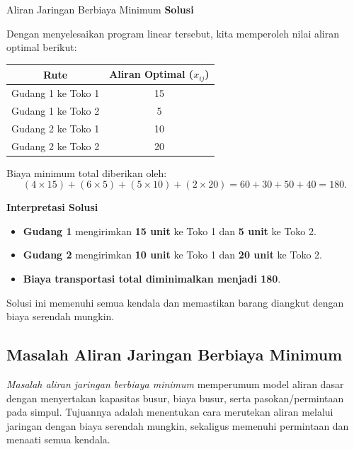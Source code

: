 \begin{examplewithallcode}{Aliran Jaringan Berbiaya Minimum}
\textbf{Solusi}

Dengan menyelesaikan program linear tersebut, kita memperoleh nilai aliran optimal berikut:

    \begin{tabular}{|c|c|}
        \hline
        Rute & Aliran Optimal ($x_{ij}$) \\
        \hline
        Gudang 1 ke Toko 1 & 15 \\
        Gudang 1 ke Toko 2 & 5 \\
        Gudang 2 ke Toko 1 & 10 \\
        Gudang 2 ke Toko 2 & 20 \\
        \hline
    \end{tabular}
\par{}\label{tab:modeling-sums-continued-tab02}%


Biaya minimum total diberikan oleh:
\[
(4 \times 15) + (6 \times 5) + (5 \times 10) + (2 \times 20) = 60 + 30 + 50 + 40 = 180.
\]

\textbf{Interpretasi Solusi}

\begin{itemize}
    \item \textbf{Gudang 1} mengirimkan \textbf{15 unit} ke Toko 1 dan \textbf{5 unit} ke Toko 2.
    \item \textbf{Gudang 2} mengirimkan \textbf{10 unit} ke Toko 1 dan \textbf{20 unit} ke Toko 2.
    \item \textbf{Biaya transportasi total diminimalkan menjadi 180}.
\end{itemize}

Solusi ini memenuhi semua kendala dan memastikan barang diangkut dengan biaya serendah mungkin.

\end{examplewithallcode}
\newpage

\subsection{Masalah Aliran Jaringan Berbiaya Minimum}
\label{sec:min-cost-network-flow}

\emph{Masalah aliran jaringan berbiaya minimum} memperumum model aliran dasar dengan menyertakan kapasitas busur, biaya busur, serta pasokan/permintaan pada simpul. Tujuannya adalah menentukan cara merutekan aliran melalui jaringan dengan biaya serendah mungkin, sekaligus memenuhi permintaan dan menaati semua kendala.

